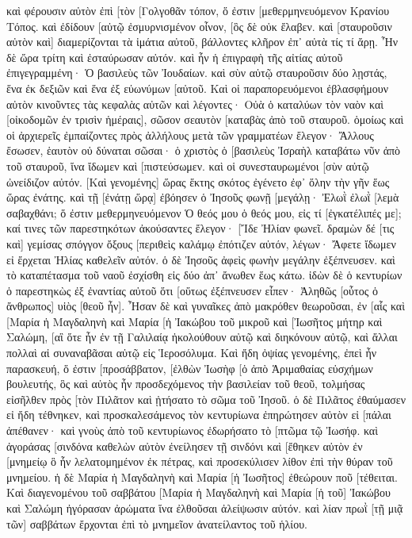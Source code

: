 καὶ φέρουσιν αὐτὸν ἐπὶ [τὸν [Γολγοθᾶν τόπον, ὅ ἐστιν [μεθερμηνευόμενον Κρανίου Τόπος. 
καὶ ἐδίδουν [αὐτῷ ἐσμυρνισμένον οἶνον, [ὃς δὲ οὐκ ἔλαβεν. 
καὶ [σταυροῦσιν αὐτὸν καὶ] διαμερίζονται τὰ ἱμάτια αὐτοῦ, βάλλοντες κλῆρον ἐπ᾽ αὐτὰ τίς τί ἄρῃ. 
Ἦν δὲ ὥρα τρίτη καὶ ἐσταύρωσαν αὐτόν. 
καὶ ἦν ἡ ἐπιγραφὴ τῆς αἰτίας αὐτοῦ ἐπιγεγραμμένη· Ὁ βασιλεὺς τῶν Ἰουδαίων. 
καὶ σὺν αὐτῷ σταυροῦσιν δύο λῃστάς, ἕνα ἐκ δεξιῶν καὶ ἕνα ἐξ εὐωνύμων [αὐτοῦ. 
Καὶ οἱ παραπορευόμενοι ἐβλασφήμουν αὐτὸν κινοῦντες τὰς κεφαλὰς αὐτῶν καὶ λέγοντες· Οὐὰ ὁ καταλύων τὸν ναὸν καὶ [οἰκοδομῶν ἐν τρισὶν ἡμέραις], 
σῶσον σεαυτὸν [καταβὰς ἀπὸ τοῦ σταυροῦ. 
ὁμοίως καὶ οἱ ἀρχιερεῖς ἐμπαίζοντες πρὸς ἀλλήλους μετὰ τῶν γραμματέων ἔλεγον· Ἄλλους ἔσωσεν, ἑαυτὸν οὐ δύναται σῶσαι· 
ὁ χριστὸς ὁ [βασιλεὺς Ἰσραὴλ καταβάτω νῦν ἀπὸ τοῦ σταυροῦ, ἵνα ἴδωμεν καὶ [πιστεύσωμεν. καὶ οἱ συνεσταυρωμένοι [σὺν αὐτῷ ὠνείδιζον αὐτόν. 
[Καὶ γενομένης] ὥρας ἕκτης σκότος ἐγένετο ἐφ᾽ ὅλην τὴν γῆν ἕως ὥρας ἐνάτης. 
καὶ τῇ [ἐνάτῃ ὥρᾳ] ἐβόησεν ὁ Ἰησοῦς φωνῇ [μεγάλῃ· Ἐλωῒ ἐλωῒ [λεμὰ σαβαχθάνι; ὅ ἐστιν μεθερμηνευόμενον Ὁ θεός μου ὁ θεός μου, εἰς τί [ἐγκατέλιπές με]; 
καί τινες τῶν παρεστηκότων ἀκούσαντες ἔλεγον· [Ἴδε Ἠλίαν φωνεῖ. 
δραμὼν δέ [τις καὶ] γεμίσας σπόγγον ὄξους [περιθεὶς καλάμῳ ἐπότιζεν αὐτόν, λέγων· Ἄφετε ἴδωμεν εἰ ἔρχεται Ἠλίας καθελεῖν αὐτόν. 
ὁ δὲ Ἰησοῦς ἀφεὶς φωνὴν μεγάλην ἐξέπνευσεν. 
καὶ τὸ καταπέτασμα τοῦ ναοῦ ἐσχίσθη εἰς δύο ἀπ᾽ ἄνωθεν ἕως κάτω. 
ἰδὼν δὲ ὁ κεντυρίων ὁ παρεστηκὼς ἐξ ἐναντίας αὐτοῦ ὅτι [οὕτως ἐξέπνευσεν εἶπεν· Ἀληθῶς [οὗτος ὁ ἄνθρωπος] υἱὸς [θεοῦ ἦν]. 
Ἦσαν δὲ καὶ γυναῖκες ἀπὸ μακρόθεν θεωροῦσαι, ἐν [αἷς καὶ [Μαρία ἡ Μαγδαληνὴ καὶ Μαρία [ἡ Ἰακώβου τοῦ μικροῦ καὶ [Ἰωσῆτος μήτηρ καὶ Σαλώμη, 
[αἳ ὅτε ἦν ἐν τῇ Γαλιλαίᾳ ἠκολούθουν αὐτῷ καὶ διηκόνουν αὐτῷ, καὶ ἄλλαι πολλαὶ αἱ συναναβᾶσαι αὐτῷ εἰς Ἱεροσόλυμα. 
Καὶ ἤδη ὀψίας γενομένης, ἐπεὶ ἦν παρασκευή, ὅ ἐστιν [προσάββατον, 
[ἐλθὼν Ἰωσὴφ [ὁ ἀπὸ Ἁριμαθαίας εὐσχήμων βουλευτής, ὃς καὶ αὐτὸς ἦν προσδεχόμενος τὴν βασιλείαν τοῦ θεοῦ, τολμήσας εἰσῆλθεν πρὸς [τὸν Πιλᾶτον καὶ ᾐτήσατο τὸ σῶμα τοῦ Ἰησοῦ. 
ὁ δὲ Πιλᾶτος ἐθαύμασεν εἰ ἤδη τέθνηκεν, καὶ προσκαλεσάμενος τὸν κεντυρίωνα ἐπηρώτησεν αὐτὸν εἰ [πάλαι ἀπέθανεν· 
καὶ γνοὺς ἀπὸ τοῦ κεντυρίωνος ἐδωρήσατο τὸ [πτῶμα τῷ Ἰωσήφ. 
καὶ ἀγοράσας [σινδόνα καθελὼν αὐτὸν ἐνείλησεν τῇ σινδόνι καὶ [ἔθηκεν αὐτὸν ἐν [μνημείῳ ὃ ἦν λελατομημένον ἐκ πέτρας, καὶ προσεκύλισεν λίθον ἐπὶ τὴν θύραν τοῦ μνημείου. 
ἡ δὲ Μαρία ἡ Μαγδαληνὴ καὶ Μαρία [ἡ Ἰωσῆτος] ἐθεώρουν ποῦ [τέθειται. 
Καὶ διαγενομένου τοῦ σαββάτου [Μαρία ἡ Μαγδαληνὴ καὶ Μαρία [ἡ τοῦ] Ἰακώβου καὶ Σαλώμη ἠγόρασαν ἀρώματα ἵνα ἐλθοῦσαι ἀλείψωσιν αὐτόν. 
καὶ λίαν πρωῒ [τῇ μιᾷ τῶν] σαββάτων ἔρχονται ἐπὶ τὸ μνημεῖον ἀνατείλαντος τοῦ ἡλίου. 
